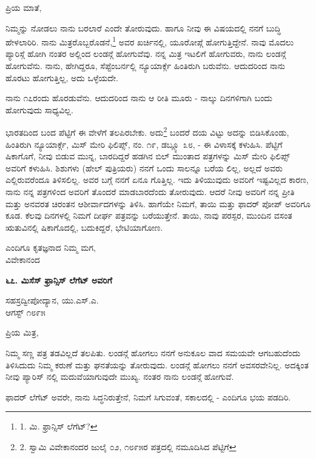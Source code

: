 ಪ್ರಿಯ ಮಾತೆ,

ನಿಮ್ಮನ್ನು ನೋಡಲು ನಾನು ಬರಲಾರೆ ಎಂದೇ ತೋರುವುದು. ಹಾಗೂ ನೀವು ಈ ವಿಷಯದಲ್ಲಿ ನನಗೆ ಬುದ್ಧಿ ಹೇಳಲಾರಿರಿ. ನಾನು ಮಿತ್ರರೊಬ್ಬರೊಡನೆ,\footnote{1. ಮಿ. ಫ್ರಾನ್ಸಿಸ್ ಲೆಗೆಟ್?} ಅವರ ಖರ್ಚಿನಲ್ಲಿ, ಯೂರೋಪ್ಗೆ ಹೋಗುತ್ತಿದ್ದೇನೆ. ನಾವು ಮೊದಲು ಪ್ಯಾರಿಸ್ಗೆ ಹೋಗಿ ನಂತರ ಅಲ್ಲಿಂದ ಲಂಡನ್ಗೆ ಹೋಗುವೆವು. ನನ್ನ ಮಿತ್ರ ಇಟಲಿಗೆ ಹೋಗುವರು, ನಾನು ಲಂಡನ್ಗೆ ಹೋಗುವೆನು. ನಾನು, ಹೇಗಿದ್ದರೂ, ಸೆಪ್ಟೆಂಬರ್ನಲ್ಲಿ ನ್ಯೂಯಾರ್ಕ್ಗೆ ಹಿಂತಿರುಗಿ ಬರುವೆನು. ಆದುದರಿಂದ ನಾನು ಹೊರಟು ಹೋಗುತ್ತಿಲ್ಲ, ಅದು ಒಳ್ಳೆಯದೇ.

ನಾನು ೧೭ರಂದು ಹೊರಡುವೆನು. ಆದುದರಿಂದ ನಾನು ಆ ರೀತಿ ಮೂರು - ನಾಲ್ಕು ದಿನಗಳಿಗಾಗಿ ಬಂದು ಹೋಗುವುದು ಸಾಧ್ಯವಿಲ್ಲ.

ಭಾರತದಿಂದ ಬಂದ ಪೆಟ್ಟಿಗೆ ಈ ವೇಳೆಗೆ ತಲಪಿರಬೇಕು. ಅದು\footnote{2. ಸ್ವಾಮಿ ವಿವೇಕಾನಂದರ ಜುಲೈ ೦೨, ೧೮೯೫ರ ಪತ್ರದಲ್ಲಿ ನಮೂದಿಸಿದ ಪೆಟ್ಟಿಗೆ} ಬಂದರೆ ದಯ ವಿಟ್ಟು ಅದನ್ನು ಬಿಡಿಸಿಕೊಂಡು, ಹಿಂತಿರುಗಿ ನ್ಯೂಯಾರ್ಕ್ಗೆ, ಮಿಸ್ ಮೇರಿ ಫಿಲಿಪ್ಸ್, ನಂ. ೧೯, ಡಬ್ಲ್ಯೂ ೩೮, - ಈ ವಿಳಾಸಕ್ಕೆ ಕಳುಹಿಸಿ. ಪೆಟ್ಟಿಗೆ ಷಿಕಾಗೊಗೆ, ನೀವು ಬಿಡುವ ಮುನ್ನ, ಬಾರದಿದ್ದರೆ ಹಡಗಿನ ಬಿಲ್ ಮುಂತಾದ ಪತ್ರಗಳನ್ನು ಮಿಸ್ ಮೇರಿ ಫಿಲಿಪ್ಸ್ ಅವರಿಗೆ ಕಳುಹಿಸಿ. ಶಿಶುಗಳು (ಹೇಲ್ ಪುತ್ರಿಯರು) ನನಗೆ ಒಂದು ಸಾಲನ್ನೂ ಬರೆಯ ಲಿಲ್ಲ, ಅಲ್ಲದೆ ಅವರು ಎಲ್ಲಿರುವರೆಂದೂ ತಿಳಿಸಲಿಲ್ಲ. ಅವರ ಬಗ್ಗೆ ನನಗೆ ಏನೂ ಗೊತ್ತಿಲ್ಲ. ಇದು ತಿಳಿಯುವುದು ಅವರಿಗೆ ಇಷ್ಟವಿಲ್ಲದ ಕಾರಣ, ನಾನು ನನ್ನ ಪತ್ರಗಳಿಂದ ಅವರಿಗೆ ತೊಂದರೆ ಮಾಡಬಾರದೆಂದು ತೋರುವುದು. ಆದರೆ ನೀವು ಅವರಿಗೆ ನನ್ನ ಪ್ರೀತಿ ಮತ್ತು ಅನವರತ ಚಿರಂತನ ಆಶೀರ್ವಾದಗಳನ್ನು ತಿಳಿಸಿ. ಹಾಗೆಯೇ ನಿಮಗೆ, ತಾಯಿ ಮತ್ತು ಫಾದರ್ ಪೋಪ್ ಅವರಿಗೂ ಕೂಡ. ಕೆಲವು ದಿನಗಳಲ್ಲಿ ನಿಮಗೆ ದೀರ್ಘ ಪತ್ರವನ್ನು ಬರೆಯುತ್ತೇನೆ. ತಾಯಿ, ನಾವು ಪರಸ್ಪರ, ಮುಂದಿನ ವಸಂತ ಋತುವಿನಲ್ಲಿ ಷಿಕಾಗೊದಲ್ಲಿ, ಬದುಕಿದ್ದರೆ, ಭೇಟಿಯಾಗೋಣ.

\begin{flushright}
ಎಂದಿಗೂ ಕೃತಜ್ಞನಾದ ನಿಮ್ಮ ಮಗ,\\ವಿವೇಕಾನಂದ
\end{flushright}

\begin{center}
\textbf{೬೭. ಮಿಸೆಸ್ ಫ್ರಾನ್ಸಿಸ್ ಲೆಗೆಟ್ ಅವರಿಗೆ}
\end{center}

\begin{flushright}
ಸಹಸ್ರದ್ವೀಪೋದ್ಯಾನ, ಯು.ಎಸ್.ಎ.\\ಆಗಸ್ಟ್ ೧೮೯೫
\end{flushright}

ಪ್ರಿಯ ಮಿತ್ರ,

ನಿಮ್ಮ ಸಣ್ಣ ಪತ್ರ ತಡವಿಲ್ಲದೆ ತಲಪಿತು. ಲಂಡನ್ಗೆ ಹೋಗಲು ನನಗೆ ಅನುಕೂಲ ವಾದ ಸಮಯವೇ ಆಗಬಹುದೆಂದು ತಿಳಿಸಿದುದು ನಿಮ್ಮ ಕರುಣೆ ಮತ್ತು ಘನತೆಯನ್ನು ತೋರುವುದು. ಲಂಡನ್ಗೆ ಹೋಗಲು ನನಗೆ ಅವಸರವೇನಿಲ್ಲ. ಅದಕ್ಕಿಂತ ನೀವು ಪ್ಯಾರಿಸ್ ನಲ್ಲಿ ಮದುವೆಯಾಗುವುದೇ ಮುಖ್ಯ. ನಂತರ ನಾನು ಲಂಡನ್ಗೆ ಹೋಗುವೆ.

ಫಾದರ್ ಲೆಗೆಟ್ ಅವರೇ, ನಾನು ಸಿದ್ಧನಿರುತ್ತೇನೆ, ನಿಮಗೆ ಸಿಗುವಂತೆ, ಸಕಾಲದಲ್ಲಿ - ಎಂದಿಗೂ ಭಯ ಪಡದಿರಿ.

